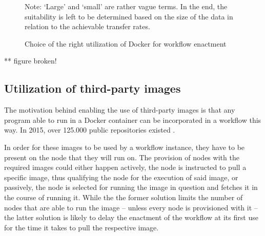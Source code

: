   \begin{figure}[htbp]
    \centering
    \newdimen\nodeDist
    \nodeDist=35mm
    \caption*{\scriptsize Note: `Large' and `small' are rather vague terms. In the end, the suitability is left to be determined based on the size of the data in relation to the achievable transfer rates.}
    \caption{Choice of the right utilization of Docker for workflow enactment}
    \label{fig:choosing_docker_utilization}
  \end{figure}
  ** figure broken!

\subsection{Utilization of third-party images} %
\label{sub:execution_of_third_party_containers}
  The motivation behind enabling the use of third-party images is that any program able to run in a Docker container can be incorporated in a workflow this way. In 2015, over 125.000 public repositories existed \cite{Dehamer2015Docker}.

  In order for these images to be used by a workflow instance, they have to be present on the node that they will run on. The provision of nodes with the required images could either happen actively, \ie the node is instructed to pull a specific image, thus qualifying the node for the execution of said image, or passively, \ie the node is selected for running the image in question and fetches it in the course of running it. While the the former solution limits the number of nodes that are able to run the image -- unless every node is provisioned with it -- the latter solution is likely to delay the enactment of the workflow at its first use for the time it takes to pull the respective image.

